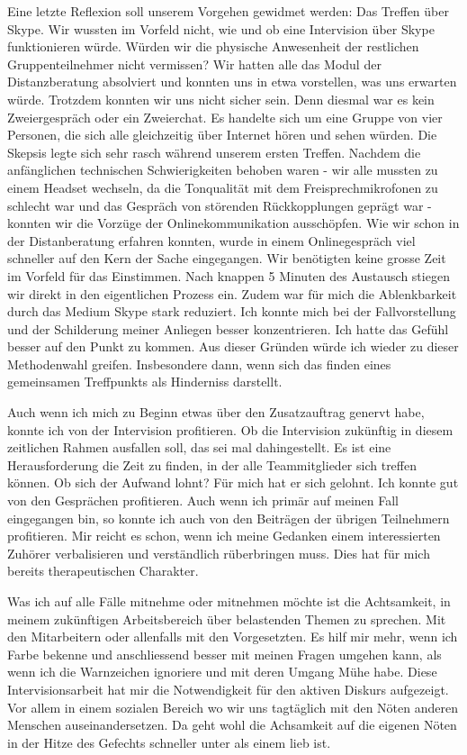 Eine letzte Reflexion soll unserem Vorgehen gewidmet werden: Das Treffen über Skype. Wir wussten im Vorfeld nicht, wie und ob eine Intervision über Skype funktionieren würde. Würden wir die physische Anwesenheit der restlichen Gruppenteilnehmer nicht vermissen? Wir hatten alle das Modul der Distanzberatung absolviert und konnten uns in etwa vorstellen, was uns erwarten würde. Trotzdem konnten wir uns nicht sicher sein. Denn diesmal war es kein Zweiergespräch oder ein Zweierchat. Es handelte sich um eine Gruppe von vier Personen, die sich alle gleichzeitig über Internet hören und sehen würden. Die Skepsis legte sich sehr rasch während unserem ersten Treffen. Nachdem die anfänglichen technischen Schwierigkeiten behoben waren - wir alle mussten zu einem Headset wechseln, da die Tonqualität mit dem Freisprechmikrofonen zu schlecht war und das Gespräch von störenden Rückkopplungen geprägt war - konnten wir die Vorzüge der Onlinekommunikation ausschöpfen. Wie wir schon in der Distanberatung erfahren konnten, wurde in einem Onlinegespräch viel schneller auf den Kern der Sache eingegangen. Wir benötigten keine grosse Zeit im Vorfeld für das Einstimmen. Nach knappen 5 Minuten des Austausch stiegen wir direkt in den eigentlichen Prozess ein. Zudem war für mich die Ablenkbarkeit durch das Medium Skype stark reduziert. Ich konnte mich bei der Fallvorstellung und der Schilderung meiner Anliegen besser konzentrieren. Ich hatte das Gefühl besser auf den Punkt zu kommen. Aus dieser Gründen würde ich wieder zu dieser Methodenwahl greifen. Insbesondere dann, wenn sich das finden eines gemeinsamen Treffpunkts als Hinderniss darstellt. 

Auch wenn ich mich zu Beginn etwas über den Zusatzauftrag genervt habe, konnte ich von der Intervision profitieren. Ob die Intervision zukünftig in diesem zeitlichen Rahmen ausfallen soll, das sei mal dahingestellt. Es ist eine Herausforderung die Zeit zu finden, in der alle Teammitglieder sich treffen können. Ob sich der Aufwand lohnt? Für mich hat er sich gelohnt. Ich konnte gut von den Gesprächen profitieren. Auch wenn ich primär auf meinen Fall eingegangen bin, so konnte ich auch von den Beiträgen der übrigen Teilnehmern profitieren. Mir reicht es schon, wenn ich meine Gedanken einem interessierten Zuhörer verbalisieren und verständlich rüberbringen muss. Dies hat für mich bereits therapeutischen Charakter.

Was ich auf alle Fälle mitnehme oder mitnehmen möchte ist die Achtsamkeit, in meinem zukünftigen Arbeitsbereich über belastenden Themen zu sprechen. Mit den Mitarbeitern oder allenfalls mit den Vorgesetzten. Es hilf mir mehr, wenn ich Farbe bekenne und anschliessend besser mit meinen Fragen umgehen kann, als wenn ich die Warnzeichen ignoriere und mit deren Umgang Mühe habe. Diese Intervisionsarbeit hat mir die Notwendigkeit für den aktiven Diskurs aufgezeigt. Vor allem in einem sozialen Bereich wo wir uns tagtäglich mit den Nöten anderen Menschen auseinandersetzen. Da geht wohl die Achsamkeit auf die eigenen Nöten in der Hitze des Gefechts schneller unter als einem lieb ist.
